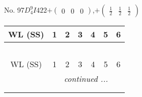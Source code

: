 \documentclass[fleqn,9pt,landscape]{jsarticle}
\begin{document}
\newpage
No. 97\quad$D_{4}^{9}$\quad$I422$\quad[ tetragonal ]\quad$+\begin{pmatrix} 0 & 0 & 0 \end{pmatrix}$,\quad $+\begin{pmatrix} \frac{1}{2} & \frac{1}{2} & \frac{1}{2} \end{pmatrix}$
\begin{center}
\renewcommand{\arraystretch}{1.2}
\begin{longtable}{ccccccc}
 \hline \hline
WL (SS) & 1 & 2 & 3 & 4 & 5 & 6 \\ \hline \endfirsthead

\multicolumn{6}{l}{\tablename\ \thetable{}} \\
 \hline \hline
WL (SS) & 1 & 2 & 3 & 4 & 5 & 6 \\ \hline \endhead

 \hline \hline
\multicolumn{6}{r}{\footnotesize\it continued ...} \\ \endfoot

 \hline \hline
\multicolumn{6}{r}{} \\ \endlastfoot


\end{longtable}
\end{center}
\end{document}
